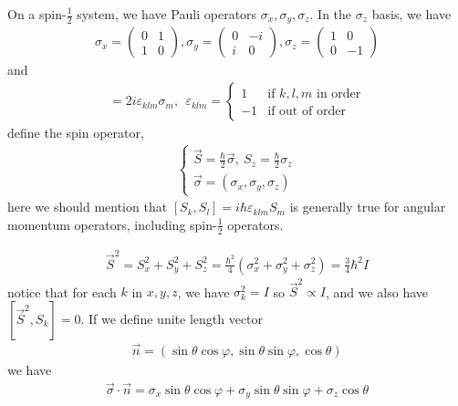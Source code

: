 \documentclass[UTF8,12pt]{article} %
\numberwithin{equation}{section}
\begin{document}
On a spin-$\frac{1}{2}$ system, we have Pauli operators $\sigma_{x}, \sigma_{y}, \sigma_{z}$. In the $\sigma_{z}$ basis, we have
\begin{align}
\sigma_{x} = \begin{pmatrix}0&1\\1&0\end{pmatrix}, \sigma_{y} = \begin{pmatrix}0&-i\\i&0\end{pmatrix}, \sigma_{z} = \begin{pmatrix}1&0\\0&-1\end{pmatrix}
\end{align}
and
\begin{align}
[\sigma_{k}, \sigma_{l}] = 2i\varepsilon_{klm}\sigma_{m}, ~~\varepsilon_{klm} = \begin{cases}1 &\text{if } k,l,m \text{ in order}\\-1 &\text{if out of order}\end{cases}
\end{align}
define the spin operator,
\begin{align}
\begin{cases}
\vec{S} = \frac{\hbar}{2}\vec{\sigma},~ S_{z} = \frac{\hbar}{2}\sigma_{z}\\
\vec{\sigma} = (\sigma_{x}, \sigma_{y}, \sigma_{z})
\end{cases}
\end{align}
here we should mention that $\boxed{[S_{k}, S_{l}] = i\hbar\varepsilon_{klm}S_{m}}$ is generally true for angular momentum operators, including spin-$\frac{1}{2}$ operators.

\begin{align}
\vec{S}^{2} = S_{x}^{2} + S_{y}^{2} + S_{z}^{2} = \frac{\hbar^{2}}{4} \left(\sigma_{x}^{2} + \sigma_{y}^{2} + \sigma_{z}^{2}\right) = \frac{3}{4} \hbar^{2} I
\end{align}
notice that for each $k$ in $x, y, z$, we have $\boxed{\sigma_{k}^{2} = I}$ so $\vec{S}^{2} \propto I$, and we also have $\boxed{[\vec{S}^{2}, S_{k}] = 0}$. If we define unite length vector
\begin{align}
\vec{n} = (\sin\theta\cos\varphi, \sin\theta\sin\varphi, \cos\theta)
\end{align}
we have
\begin{align}
\vec{\sigma}\cdot\vec{n} = \sigma_{x}\sin\theta\cos\varphi + \sigma_{y}\sin\theta\sin\varphi + \sigma_{z}\cos\theta
\end{align}
\end{document}
